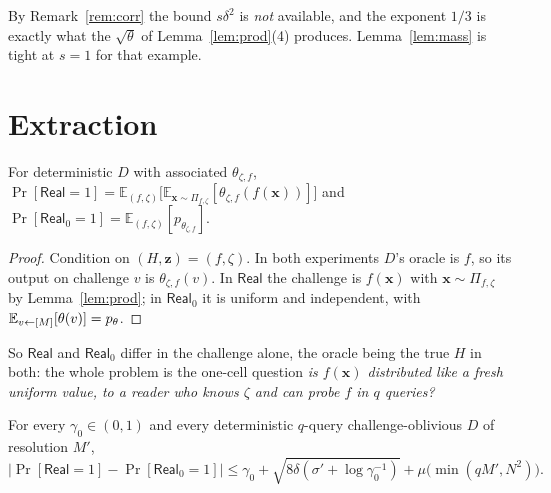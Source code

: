 \documentclass{aicr-solution}
\newcommand{\Real}{\mathsf{Real}}
\newcommand{\Prob}[1]{\Pr\!\left[#1\right]}
\newcommand{\Exp}{\mathbb{E}}
\newcommand{\vx}{\mathbf{x}}
\newcommand{\vz}{\mathbf{z}}
\begin{document}
By Remark~\ref{rem:corr} the bound $s\delta^{2}$ is \emph{not} available, and the
exponent $1/3$ is exactly what the $\sqrt\theta$ of Lemma~\ref{lem:prod}(4)
produces. Lemma~\ref{lem:mass} is tight at $s=1$ for that example.

\section{Extraction}

\begin{lemma}\label{lem:ident}
For deterministic $D$ with associated $\theta_{\zeta,f}$,
$\Prob{\Real=1}=\Exp_{(f,\zeta)}\bigl[\Exp_{\vx\sim\Pi_{f,\zeta}}[\theta_{\zeta,f}(f(\vx))]\bigr]$
and $\Prob{\Real_0=1}=\Exp_{(f,\zeta)}[p_{\theta_{\zeta,f}}]$.
\end{lemma}

\begin{proof}
Condition on $(H,\vz)=(f,\zeta)$. In both experiments $D$'s oracle is $f$, so its
output on challenge $v$ is $\theta_{\zeta,f}(v)$. In $\Real$ the challenge is
$f(\vx)$ with $\vx\sim\Pi_{f,\zeta}$ by Lemma~\ref{lem:prod}; in $\Real_0$ it is
uniform and independent, with $\Exp_{v\sample[M]}[\theta(v)]=p_\theta$.
\end{proof}

So $\Real$ and $\Real_0$ differ in the challenge alone, the oracle being the true
$H$ in both: the whole problem is the one-cell question \emph{is $f(\vx)$
distributed like a fresh uniform value, to a reader who knows $\zeta$ and can
probe $f$ in $q$ queries?}

\begin{proposition}\label{prop:master}
For every $\gamma_0\in(0,1)$ and every deterministic $q$-query
challenge-oblivious $D$ of resolution $M'$,
\[
  \bigl|\Prob{\Real=1}-\Prob{\Real_0=1}\bigr|\le\gamma_0
  +\sqrt{8\delta(\sigma'+\log\gamma_0^{-1})}+\mu\bigl(\min(qM',N^{2})\bigr).
\]
\end{proposition}
\end{document}

